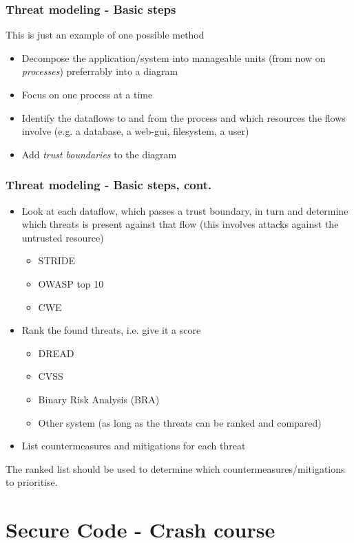 \documentclass{beamer}
\begin{document}
    \begin{frame}
      \frametitle{Threat modeling - Basic steps}
      This is just an example of one possible method
      \begin{itemize}
        \item Decompose the application/system into manageable units (from now on \textit{processes})
        preferrably into a diagram
        \item Focus on one process at a time
        \item Identify the dataflows to and from the process and which resources the flows involve (e.g. a database, a web-gui, filesystem, a user)
        \item Add \textit{trust boundaries} to the diagram
      \end{itemize}
    \end{frame}
    \begin{frame}
      \frametitle{Threat modeling - Basic steps, cont.}
      \begin{itemize}
        \item Look at each dataflow, which passes a trust boundary, in turn and determine which threats is present against that flow (this involves attacks against the untrusted resource)
        \begin{itemize}
          \item STRIDE
          \item OWASP top 10
          \item CWE
        \end{itemize}
        \item Rank the found threats, i.e. give it a score
        \begin{itemize}
          \item DREAD
          \item CVSS
          \item Binary Risk Analysis (BRA)
          \item Other system (as long as the threats can be ranked and compared)
        \end{itemize}
        \item List countermeasures and mitigations for each threat
      \end{itemize}
      The ranked list should be used to determine which countermeasures/mitigations
      to prioritise.
    \end{frame}

\section{Secure Code - Crash course}
\end{document}
